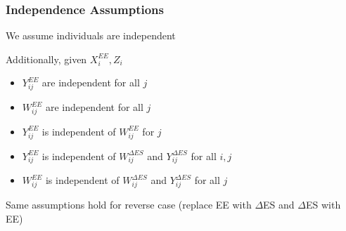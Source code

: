 \documentclass[handout]{beamer}\usepackage[]{graphicx}\usepackage[]{color}
\begin{document}
\begin{frame}
\frametitle{Independence Assumptions}
We assume individuals are independent \\

\vspace{0.2cm}

Additionally, given $X_i^{EE}, Z_i$

\begin{itemize}
\item
$Y^{EE}_{ij}$ are independent for all $j$ \\
\item
$W_{ij}^{EE}$ are independent for all $j$ \\
\item
$Y_{ij}^{EE}$ is independent of $W_{ij}^{EE}$ for $j$ \\
\item
$Y_{ij}^{EE}$ is independent of $W_{ij}^{\Delta ES}$ and $Y_{ij}^{\Delta ES}$ for all $i,j$ \\
\item
$W_{ij}^{EE}$ is independent of $W_{ij}^{\Delta ES}$ and $Y_{ij}^{\Delta ES}$ for all $j$ \\
\end{itemize}

\vspace{0.2cm}

Same assumptions hold for reverse case (replace EE with $\Delta$ES and $\Delta$ES with EE)


\end{frame}


% 
% 
% 
% 
\end{document}
